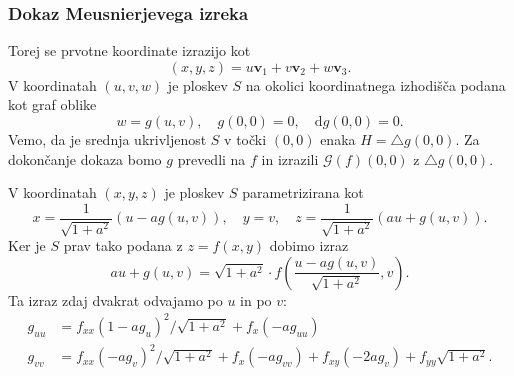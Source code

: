 \documentclass[8pt]{beamer}
\theoremstyle{definition}
\theoremstyle{remark}
\theoremstyle{plain}
\numberwithin{equation}{section}  %
\begin{document}
\begin{frame}
    \frametitle{Dokaz Meusnierjevega izreka}

    Torej se prvotne koordinate izrazijo kot 
    \begin{equation*}
        (x, y, z)=u \mathbf{v}_1+v \mathbf{v}_2+w \mathbf{v}_3.
    \end{equation*}
    V koordinatah $(u,v,w)$ je ploskev $S$ na okolici koordinatnega izhodišča podana kot graf oblike
    \begin{equation*}
        w=g(u, v), \quad g(0,0)=0, \quad \mathrm{d} g(0,0)=0.
    \end{equation*}
    Vemo, da je srednja ukrivljenost $S$ v točki $(0,0)$ enaka $H=\bigtriangleup g(0,0)$. Za dokončanje dokaza bomo $g$ prevedli na $f$ in izrazili $\mathscr{G}(f)(0,0)$ z $\bigtriangleup g(0,0)$. 
    
    \vspace{0.8em}
    V koordinatah $(x, y, z)$ je ploskev $S$ parametrizirana kot 
    \begin{equation*}
        x=\frac{1}{\sqrt{1+a^2}}(u-a g(u, v)), \quad y=v, \quad z=\frac{1}{\sqrt{1+a^2}}(a u+g(u, v)) .
    \end{equation*}
    Ker je $S$ prav tako podana z $z=f(x, y)$ dobimo izraz
    \begin{equation*}
        a u+g(u, v)=\sqrt{1+a^2} \cdot f\left(\frac{u-a g(u, v)}{\sqrt{1+a^2}}, v\right) .
    \end{equation*}
    Ta izraz zdaj dvakrat odvajamo po $u$ in po $v$: 
    \begin{align*}
        g_{u u} & =f_{x x}\left(1-a g_u\right)^2 / \sqrt{1+a^2}+f_x\left(-a g_{u u}\right) \\
        g_{v v} & =f_{x x}\left(-a g_v\right)^2 / \sqrt{1+a^2}+f_x\left(-a g_{v v}\right)+f_{x y}\left(-2 a g_v\right)+f_{y y} \sqrt{1+a^2} .
    \end{align*}
    
\end{frame}
\end{document}
